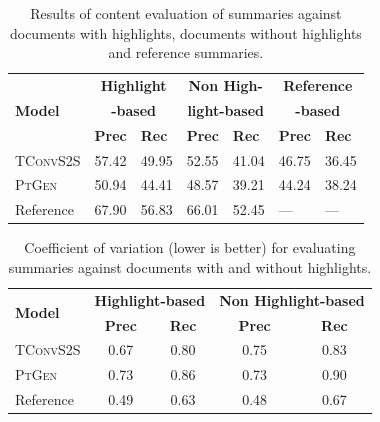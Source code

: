 \documentclass[11pt,a4paper]{article}
\newcommand\ptgen{\textsc{PtGen}}
\newcommand\tconv{\textsc{TConvS2S}}
\begin{document}
\begin{table}[ht!]
\small
\begin{tabular}{l|p{0.4cm}p{0.6cm}|p{0.4cm}p{0.4cm}|p{0.4cm}p{0.4cm}}
\hline
\multirow{3}{*}{\textbf{Model}}                & \multicolumn{2}{c|}{\textbf{Highlight}}                              & \multicolumn{2}{c|}{\textbf{Non High-}} & 
\multicolumn{2}{c}{\textbf{Reference}}\\
\multirow{2}{*}{}                
& \multicolumn{2}{c|}{\textbf{-based}}                              & \multicolumn{2}{c|}{\textbf{light-based}} & 
\multicolumn{2}{c}{\textbf{-based}}\\
& \textbf{Prec} & \textbf{Rec} 
& \textbf{Prec} & \textbf{Rec}
& \textbf{Prec} & \textbf{Rec} \\ \hline
\tconv{} & 57.42 & 49.95 & 52.55 & 41.04 & 46.75 & 36.45             \\
\ptgen{} & 50.94 & 44.41 & 48.57 & 39.21  & 44.24 & 38.24             \\
Reference & 67.90 & 56.83 & 66.01 & 52.45  & --- & --- \\
\hline
\end{tabular}
\caption{Results of content evaluation of summaries against documents with highlights, documents without highlights and reference summaries.}
\label{table:summresult}
\end{table}

\begin{table}[ht!]
\small
\begin{tabular}{l|cc|cc}
\hline
\multirow{2}{*}{\textbf{Model}} & 
\multicolumn{2}{c|}{\textbf{Highlight-based}} & 
\multicolumn{2}{c}{\textbf{Non Highlight-based}} \\
&\textbf{Prec} & \textbf{Rec} & 
 \textbf{Prec} & \textbf{Rec} \\ \hline
\tconv{} & 0.67 & 0.80 & 0.75                             & 0.83  \\
\ptgen{} & 0.73 & 0.86 & 0.73   & 0.90  \\
Reference                             & 0.49                           & 0.63 & 0.48   & 0.67 \\
\hline

\end{tabular}
\caption{Coefficient of variation (lower is better) for evaluating summaries against documents with and without highlights.}
\label{table:summresultcv}
\end{table}
\end{document}
